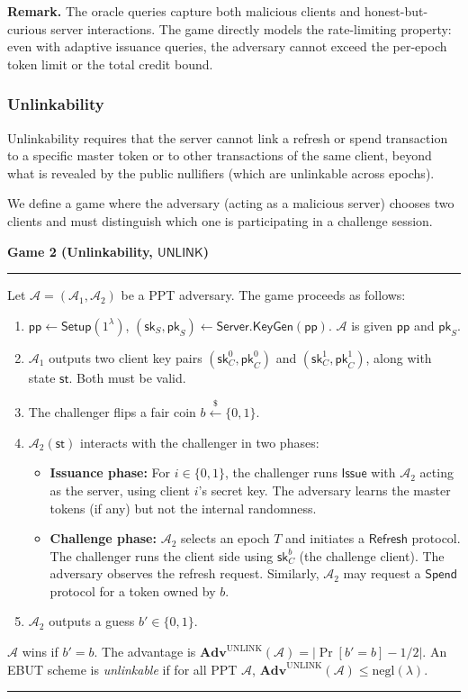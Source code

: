 \documentclass[11pt]{article}
\theoremstyle{definitionstyle}
\theoremstyle{plain}
\newenvironment{game}[2][]
  {\par\addvspace{\topsep}\noindent\textbf{Game #2}\ #1\par\nobreak\smallskip\hrule\smallskip}
  {\hrule\par\addvspace{\topsep}}
\newcommand{\advantage}[1]{\mathbf{Adv}^{\mathrm{#1}}}
\newcommand{\negl}{\mathrm{negl}}
\begin{document}
\noindent \textbf{Remark.} The oracle queries capture both malicious clients and honest-but-curious server interactions. The game directly models the rate-limiting property: even with adaptive issuance queries, the adversary cannot exceed the per-epoch token limit or the total credit bound.

\subsubsection{Unlinkability}
Unlinkability requires that the server cannot link a refresh or spend transaction to a specific master token or to other transactions of the same client, beyond what is revealed by the public nullifiers (which are unlinkable across epochs).

We define a game where the adversary (acting as a malicious server) chooses two clients and must distinguish which one is participating in a challenge session.

\begin{game}{2 (Unlinkability, $\mathsf{UNLINK}$)}
Let $\mathcal{A} = (\mathcal{A}_1, \mathcal{A}_2)$ be a PPT adversary. The game proceeds as follows:
\begin{enumerate}[leftmargin=*]
\item $\mathsf{pp} \leftarrow \mathsf{Setup}(1^\lambda)$, $(\mathsf{sk}_S, \mathsf{pk}_S) \leftarrow \mathsf{Server.KeyGen}(\mathsf{pp})$. $\mathcal{A}$ is given $\mathsf{pp}$ and $\mathsf{pk}_S$.
\item $\mathcal{A}_1$ outputs two client key pairs $(\mathsf{sk}_C^0, \mathsf{pk}_C^0)$ and $(\mathsf{sk}_C^1, \mathsf{pk}_C^1)$, along with state $\mathsf{st}$. Both must be valid.
\item The challenger flips a fair coin $b \xleftarrow{\$} \{0,1\}$. 
\item $\mathcal{A}_2(\mathsf{st})$ interacts with the challenger in two phases:
  \begin{itemize}
  \item \textbf{Issuance phase:} For $i \in \{0,1\}$, the challenger runs $\mathsf{Issue}$ with $\mathcal{A}_2$ acting as the server, using client $i$'s secret key. The adversary learns the master tokens (if any) but not the internal randomness.
  \item \textbf{Challenge phase:} $\mathcal{A}_2$ selects an epoch $T$ and initiates a $\mathsf{Refresh}$ protocol. The challenger runs the client side using $\mathsf{sk}_C^b$ (the challenge client). The adversary observes the refresh request. Similarly, $\mathcal{A}_2$ may request a $\mathsf{Spend}$ protocol for a token owned by $b$.
  \end{itemize}
\item $\mathcal{A}_2$ outputs a guess $b' \in \{0,1\}$.
\end{enumerate}
$\mathcal{A}$ wins if $b' = b$. The advantage is $\advantage{UNLINK}(\mathcal{A}) = |\Pr[b' = b] - 1/2|$. An EBUT scheme is \emph{unlinkable} if for all PPT $\mathcal{A}$, $\advantage{UNLINK}(\mathcal{A}) \le \negl(\lambda)$.
\end{game}
\end{document}

